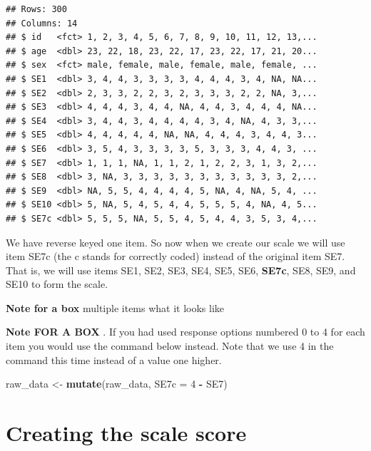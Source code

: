 \documentclass[
]{krantz}
\makeatletter
\newenvironment{Shaded}{\begin{snugshade}}{\end{snugshade}}
\newcommand{\DataTypeTok}[1]{\textcolor[rgb]{0.27,0.27,0.27}{#1}}
\newcommand{\DecValTok}[1]{\textcolor[rgb]{0.06,0.06,0.06}{#1}}
\newcommand{\KeywordTok}[1]{\textcolor[rgb]{0.27,0.27,0.27}{\textbf{#1}}}
\newcommand{\NormalTok}[1]{#1}
\newcommand{\OperatorTok}[1]{\textcolor[rgb]{0.43,0.43,0.43}{\textbf{#1}}}
\newcommand{\OtherTok}[1]{\textcolor[rgb]{0.37,0.37,0.37}{#1}}
\newcommand{\StringTok}[1]{\textcolor[rgb]{0.5,0.5,0.5}{#1}}
\newenvironment{kframe}{%
\medskip{}
\setlength{\fboxsep}{.8em}
 \def\at@end@of@kframe{}%
 \ifinner\ifhmode%
  \def\at@end@of@kframe{\end{minipage}}%
  \begin{minipage}{\columnwidth}%
 \fi\fi%
 \def\FrameCommand##1{\hskip\@totalleftmargin \hskip-\fboxsep
 \colorbox{shadecolor}{##1}\hskip-\fboxsep
     \hskip-\linewidth \hskip-\@totalleftmargin \hskip\columnwidth}%
 \MakeFramed {\advance\hsize-\width
   \@totalleftmargin\z@ \linewidth\hsize
   \@setminipage}}%
 {\par\unskip\endMakeFramed%
 \at@end@of@kframe}
\renewenvironment{Shaded}{\begin{kframe}}{\end{kframe}}
\makeatother
\begin{document}
\begin{verbatim}
## Rows: 300
## Columns: 14
## $ id   <fct> 1, 2, 3, 4, 5, 6, 7, 8, 9, 10, 11, 12, 13,...
## $ age  <dbl> 23, 22, 18, 23, 22, 17, 23, 22, 17, 21, 20...
## $ sex  <fct> male, female, male, female, male, female, ...
## $ SE1  <dbl> 3, 4, 4, 3, 3, 3, 3, 4, 4, 4, 3, 4, NA, NA...
## $ SE2  <dbl> 2, 3, 3, 2, 2, 3, 2, 3, 3, 3, 2, 2, NA, 3,...
## $ SE3  <dbl> 4, 4, 4, 3, 4, 4, NA, 4, 4, 3, 4, 4, 4, NA...
## $ SE4  <dbl> 3, 4, 4, 3, 4, 4, 4, 4, 3, 4, NA, 4, 3, 3,...
## $ SE5  <dbl> 4, 4, 4, 4, 4, NA, NA, 4, 4, 4, 3, 4, 4, 3...
## $ SE6  <dbl> 3, 5, 4, 3, 3, 3, 3, 5, 3, 3, 3, 4, 4, 3, ...
## $ SE7  <dbl> 1, 1, 1, NA, 1, 1, 2, 1, 2, 2, 3, 1, 3, 2,...
## $ SE8  <dbl> 3, NA, 3, 3, 3, 3, 3, 3, 3, 3, 3, 3, 3, 2,...
## $ SE9  <dbl> NA, 5, 5, 4, 4, 4, 4, 5, NA, 4, NA, 5, 4, ...
## $ SE10 <dbl> 5, NA, 5, 4, 5, 4, 4, 5, 5, 5, 4, NA, 4, 5...
## $ SE7c <dbl> 5, 5, 5, NA, 5, 5, 4, 5, 4, 4, 3, 5, 3, 4,...
\end{verbatim}

We have reverse keyed one item. So now when we create our scale we will use item SE7c (the c stands for correctly coded) instead of the original item SE7. That is, we will use items SE1, SE2, SE3, SE4, SE5, SE6, \textbf{SE7c}, SE8, SE9, and SE10 to form the scale.

\textbf{Note for a box} multiple items what it looks like

\textbf{Note FOR A BOX }. If you had used response options numbered 0 to 4 for each item you would use the command below instead. Note that we use 4 in the command this time instead of a value one higher.

\begin{Shaded}
\begin{Highlighting}[]
\NormalTok{raw_data <-}\StringTok{ }\KeywordTok{mutate}\NormalTok{(raw_data, }\DataTypeTok{SE7c =} \DecValTok{4} \OperatorTok{-}\StringTok{ }\NormalTok{SE7) }
\end{Highlighting}
\end{Shaded}

\hypertarget{creating-the-scale-score}{%
\section{Creating the scale score}\label{creating-the-scale-score}}

\begin{Shaded}
\end{Shaded}
\end{document}
